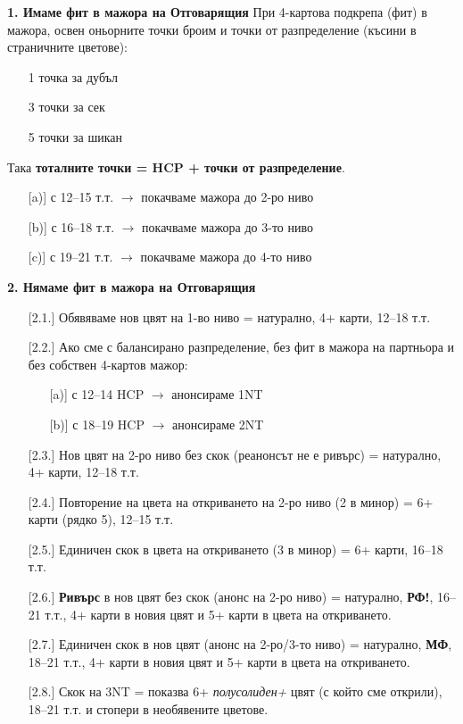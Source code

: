 \documentclass[10pt,a5paper]{extarticle}
\begin{document}
\textbf{1. Имаме фит в мажора на Отговарящия}
При 4-картова подкрепа (фит) в мажора, освен оньорните точки броим и точки от разпределение (късини в страничните цветове):  
\begin{itemize}
    \item[] 1 точка за дубъл
    \item[] 3 точки за сек
    \item[] 5 точки за шикан
\end{itemize}
Така \textbf{тоталните точки = HCP + точки от разпределение}.
\begin{itemize}
    \item[][a)] с 12–15 т.т. $\rightarrow$ покачваме мажора до 2-ро ниво
    \item[][b)] с 16–18 т.т. $\rightarrow$ покачваме мажора до 3-то ниво
    \item[][c)] с 19–21 т.т. $\rightarrow$ покачваме мажора до 4-то ниво
\end{itemize}

\textbf{2. Нямаме фит в мажора на Отговарящия}
\begin{itemize}
    \item[][2.1.] Обявяваме нов цвят на 1-во ниво = натурално, 4+ карти, 12–18 т.т.
    \item[][2.2.] Ако сме с балансирано разпределение, без фит в мажора на партньора и без собствен 4-картов мажор:
        \begin{itemize}
            \item[][a)] с 12–14 HCP $\rightarrow$ анонсираме 1NT
            \item[][b)] с 18–19 HCP $\rightarrow$ анонсираме 2NT
        \end{itemize}
    \item[][2.3.] Нов цвят на 2-ро ниво без скок (реанонсът не е ривърс) = натурално, 4+ карти, 12–18 т.т.
    \item[][2.4.] Повторение на цвета на откриването на 2-ро ниво (2 в минор) = 6+ карти (рядко 5), 12–15 т.т.
    \item[][2.5.] Единичен скок в цвета на откриването (3 в минор) = 6+ карти, 16–18 т.т.
    \item[][2.6.] \textbf{Ривърс} в нов цвят без скок (анонс на 2-ро ниво) = натурално, \textbf{РФ!}, 16–21 т.т., 4+ карти в новия цвят и 5+ карти в цвета на откриването.
    \item[][2.7.] Единичен скок в нов цвят (анонс на 2-ро/3-то ниво) = натурално, \textbf{МФ}, 18–21 т.т., 4+ карти в новия цвят и 5+ карти в цвета на откриването.
    \item[][2.8.] Скок на 3NT = показва 6+ \emph{полусолиден+} цвят (с който сме открили), 18–21 т.т. и стопери в необявените цветове.
\end{itemize}
\end{document}
